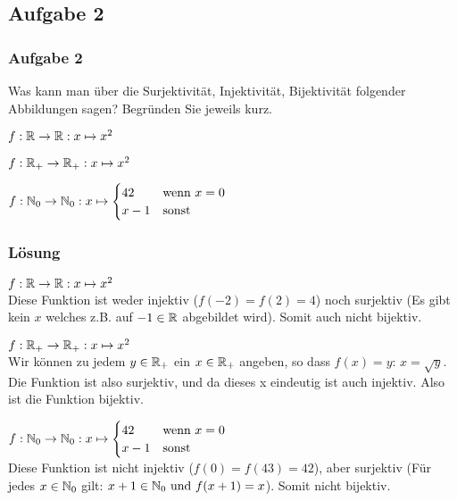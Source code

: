 \subsection{Aufgabe 2}
\begin{frame}
	\frametitle{Aufgabe 2}
	
	Was kann man über die Surjektivität, Injektivität, Bijektivität folgender Abbildungen sagen? Begründen Sie jeweils kurz.
	
	\begin{alist}
		\item $f: \mathbb{R} \to \mathbb{R}: x \mapsto x^2$
		\item $f: \mathbb{R}_+ \to \mathbb{R}_+: x \mapsto x^2$
		\item $f: \mathbb{N}_0 \to \mathbb{N}_0 : x \mapsto \begin{cases} 42 &\text{wenn $x = 0$} \\ x - 1 &\text{sonst} \end{cases}$
	\end{alist}
\end{frame}

\begin{frame}
	\frametitle{Lösung}
	\begin{alist}
		\item $f: \mathbb{R} \to \mathbb{R}: x \mapsto x^2$ \\
		\pause
		Diese Funktion ist weder injektiv ($f(-2) = f(2) = 4$) noch surjektiv (Es gibt kein $x$ welches z.B. auf $-1 \in \mathbb{R}$ abgebildet wird). Somit auch nicht bijektiv.
		
		\item $f: \mathbb{R}_+ \to \mathbb{R}_+: x \mapsto x^2$ \\
		\pause
		Wir können zu jedem $y \in \mathbb{R}_+$ ein $x \in \mathbb{R}_+$ angeben, so dass $f(x) = y$: $ x = \sqrt{y}$. \\
		Die Funktion ist also surjektiv, und da dieses x eindeutig ist auch injektiv. Also ist die Funktion bijektiv.
		
		\item $f: \mathbb{N}_0 \to \mathbb{N}_0 : x \mapsto \begin{cases} 42 &\text{wenn $x = 0$} \\ x - 1 &\text{sonst} \end{cases}$ \\
		\pause
		Diese Funktion ist nicht injektiv ($f(0) = f(43) = 42$), aber surjektiv (Für jedes $x \in \mathbb{N}_0$ gilt: $x + 1 \in \mathbb{N}_0 \text{ und } f(x+1) = x$). Somit nicht bijektiv.
	\end{alist}
\end{frame}

